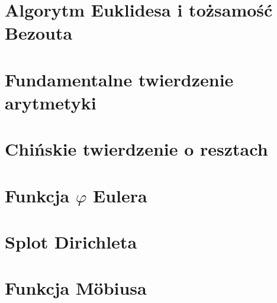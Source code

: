 \section{Algorytm Euklidesa i tożsamość Bezouta}

\section{Fundamentalne twierdzenie arytmetyki}

\section{Chińskie twierdzenie o resztach}

\section{Funkcja \texorpdfstring{\(\varphi\)}{phi} Eulera}

\section{Splot Dirichleta}

\section{Funkcja Möbiusa}

